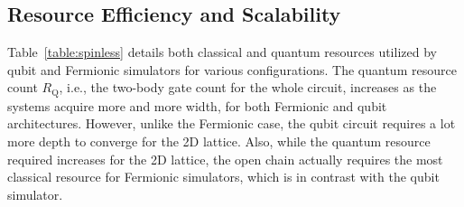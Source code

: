 \documentclass[aps, pra, reprint, superscriptaddress]{revtex4-1}
\begin{document}
\subsection{Resource Efficiency and Scalability}
\label{subsec:spinless_resource_efficiency}


Table~\ref{table:spinless} details both classical and quantum resources utilized by qubit and Fermionic simulators for various configurations. The quantum resource count $R_\text{Q}$, i.e., the two-body gate count for the whole circuit, increases as the systems acquire more and more width, for both Fermionic and qubit architectures. However, unlike the Fermionic case, the qubit circuit requires a lot more depth to converge for the 2D lattice. Also, while the quantum resource required increases for the 2D lattice, the open chain actually requires the most classical resource for Fermionic simulators, which is in contrast with the qubit simulator. 
\end{document}
